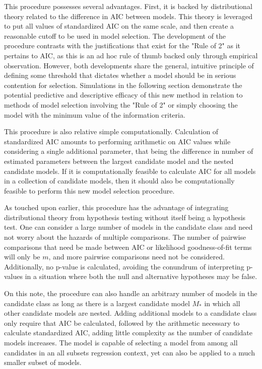 		This procedure possesses several advantages. First, it is backed by distributional theory related to the difference in AIC between models. This theory is leveraged
		to put all values of standardized AIC on the same scale, and then create a reasonable cutoff to be used in model selection. The development of the procedure
		contrasts with the justifications that exist for the "Rule of 2" as it pertains to AIC, as this is an ad hoc rule of thumb backed only through empirical
		observation. However, both developments share the general, intuitive principle of defining some threshold that dictates whether a model should be in serious
		contention for selection. Simulations in the following section demonstrate the potential predictive and descriptive efficacy of this new method in relation
		to methods of model selection involving the "Rule of 2" or simply choosing the model with the minimum value of the information criteria.
		
		This procedure is also relative simple computationally. Calculation of standardized AIC amounts to performing arithmetic on AIC values while considering
		a single additional parameter, that being the difference in number of estimated parameters between the largest candidate model and the nested candidate 
		models. If it is computationally feasible to calculate AIC for all models in a collection of candidate models, then it should also be computationally
		feasible to perform this new model selection procedure.
		
		As touched upon earlier, this procedure has the advantage of integrating distributional theory from hypothesis testing without itself being a hypothesis test.
		One can consider a large number of models in the candidate class and need not worry about the hazards of multiple comparisons. The number of pairwise comparisons
		that need be made between AIC or likelihood goodness-of-fit terms will only be $m$, and more pairwise comparisons need not be considered. Additionally, no p-value
		is calculated, avoiding the conundrum of interpreting p-values in a situation where both the null and alternative hypotheses may be false.

		On this note, the procedure can also handle an arbitrary number of models in the candidate class as long as there is a largest candidate model $M_*$ in which all
		other candidate models are nested. Adding additional models to a candidate class only require that AIC be calculated, followed by the arithmetic necessary to
		calculate standardized AIC, adding little complexity as the number of candidate models increases. The model is capable of selecting a model from among all
		candidates in an all subsets regression context, yet can also be applied to a much smaller subset of models.

